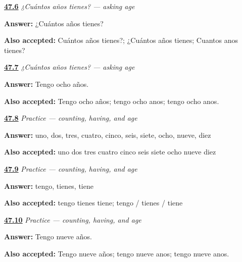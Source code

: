 \noindent\begin{minipage}[t]{\linewidth}
\raggedright
\hyperlink{review-ES-C08-cuantos-anos-ask}{\textbf{47.6}} \emph{¿Cuántos años tienes? — asking age}\par
\small \textbf{Answer:} ¿Cuántos años tienes?\par
\footnotesize \textbf{Also accepted:} Cuántos años tienes?; ¿Cuántos años tienes; Cuantos anos tienes?
\end{minipage}\par\medskip

\noindent\begin{minipage}[t]{\linewidth}
\raggedright
\hyperlink{review-ES-C08-cuantos-anos-eight}{\textbf{47.7}} \emph{¿Cuántos años tienes? — asking age}\par
\small \textbf{Answer:} Tengo ocho años.\par
\footnotesize \textbf{Also accepted:} Tengo ocho años; tengo ocho anos; tengo ocho anos.
\end{minipage}\par\medskip

\noindent\begin{minipage}[t]{\linewidth}
\raggedright
\hyperlink{review-ES-C08-practice-count-ten}{\textbf{47.8}} \emph{Practice — counting, having, and age}\par
\small \textbf{Answer:} uno, dos, tres, cuatro, cinco, seis, siete, ocho, nueve, diez\par
\footnotesize \textbf{Also accepted:} uno dos tres cuatro cinco seis siete ocho nueve diez
\end{minipage}\par\medskip

\noindent\begin{minipage}[t]{\linewidth}
\raggedright
\hyperlink{review-ES-C08-practice-tener-singular}{\textbf{47.9}} \emph{Practice — counting, having, and age}\par
\small \textbf{Answer:} tengo, tienes, tiene\par
\footnotesize \textbf{Also accepted:} tengo tienes tiene; tengo / tienes / tiene
\end{minipage}\par\medskip

\noindent\begin{minipage}[t]{\linewidth}
\raggedright
\hyperlink{review-ES-C08-practice-age-nine}{\textbf{47.10}} \emph{Practice — counting, having, and age}\par
\small \textbf{Answer:} Tengo nueve años.\par
\footnotesize \textbf{Also accepted:} Tengo nueve años; tengo nueve anos; tengo nueve anos.
\end{minipage}\par\medskip

